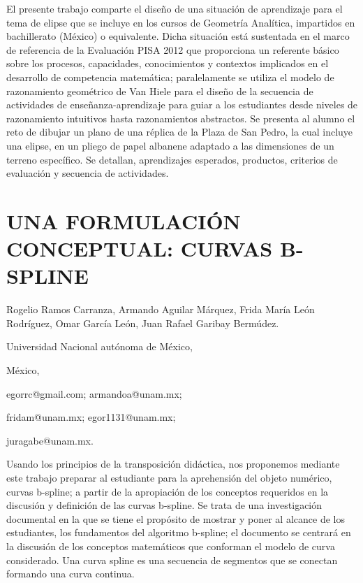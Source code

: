El presente trabajo comparte el diseño de una situación de aprendizaje
para el tema de elipse que se incluye en los cursos de Geometría Analítica,
impartidos en bachillerato (México) o equivalente. Dicha situación
está sustentada en el marco de referencia de la Evaluación PISA 2012
que proporciona un referente básico sobre los procesos, capacidades,
conocimientos y contextos implicados en el desarrollo de competencia
matemática; paralelamente se utiliza el modelo de razonamiento geométrico
de Van Hiele para el diseño de la secuencia de actividades de enseñanza-aprendizaje
para guiar a los estudiantes desde niveles de razonamiento intuitivos
hasta razonamientos abstractos. Se presenta al alumno el reto de dibujar
un plano de una réplica de la Plaza de San Pedro, la cual incluye
una elipse, en un pliego de papel albanene adaptado a las dimensiones
de un terreno específico. Se detallan, aprendizajes esperados, productos,
criterios de evaluación y secuencia de actividades. 


\section{UNA FORMULACIÓN CONCEPTUAL: CURVAS B-SPLINE}

\begin{datos}

Rogelio Ramos Carranza, Armando Aguilar Márquez, Frida María León
Rodríguez, Omar García León, Juan Rafael Garibay Bermúdez.

Universidad Nacional autónoma de México,

México,

egorrc@gmail.com; armandoa@unam.mx;

fridam@unam.mx; egor1131@unam.mx;

juragabe@unam.mx.

\end{datos}

Usando los principios de la transposición didáctica, nos proponemos
mediante este trabajo preparar al estudiante para la aprehensión del
objeto numérico, curvas b-spline; a partir de la apropiación de los
conceptos requeridos en la discusión y definición de las curvas b-spline.
Se trata de una investigación documental en la que se tiene el propósito
de mostrar y poner al alcance de los estudiantes, los fundamentos
del algoritmo b-spline; el documento se centrará en la discusión de
los conceptos matemáticos que conforman el modelo de curva considerado.
Una curva spline es una secuencia de segmentos que se conectan formando
una curva continua. 


